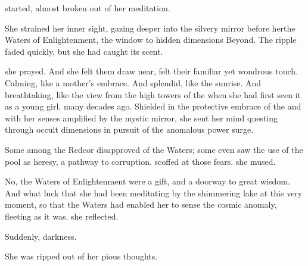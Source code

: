   \EsmerelFull{} started, almost broken out of her meditation. 


She strained her inner sight, gazing deeper into the silvery mirror before her\dash the Waters of Enlightenment, the window to hidden dimensions Beyond. The ripple faded quickly, but she had caught its scent. 

 she prayed. 
And she felt them draw near, felt their familiar yet wondrous touch. Calming, like a mother's embrace. And splendid, like the sunrise. And breathtaking, like the view from the high towers of the \TopazChateau{} when she had first seen it as a young girl, many decades ago. Shielded in the protective embrace of the \sephiroth{} and with her senses amplified by the mystic mirror, she sent her mind questing through occult dimensions in pursuit of the anomalous power surge. 

Some among the Redcor disapproved of the Waters; some even saw the use of the pool as heresy, a pathway to corruption. 
\Esmerel{} scoffed at those fears. 
 she mused. 

No, the Waters of Enlightenment were a gift, and a doorway to great wisdom. And what luck that she had been meditating by the shimmering lake at this very moment, so that the Waters had enabled her to sense the cosmic anomaly, fleeting as it was. 
 she reflected. 


Suddenly, darkness. 

She was ripped out of her pious thoughts. 

